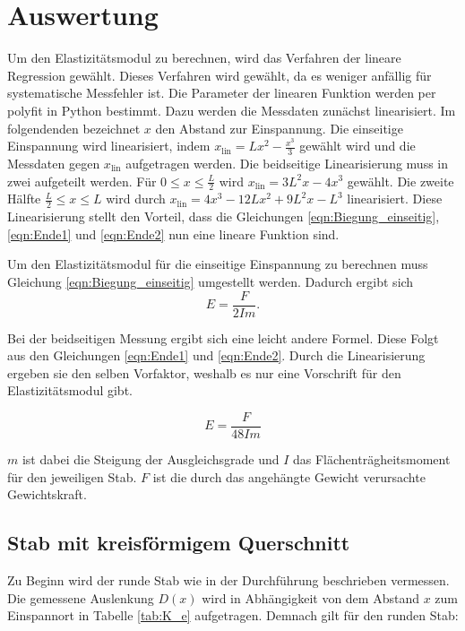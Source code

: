 


\section{Auswertung}
Um den Elastizitätsmodul zu berechnen, wird das Verfahren der lineare Regression gewählt. Dieses Verfahren wird gewählt, 
da es weniger anfällig für systematische Messfehler ist. Die Parameter der linearen Funktion werden per polyfit in Python 
bestimmt. Dazu werden die Messdaten 
zunächst linearisiert. Im folgendenden bezeichnet $x$ den Abstand zur Einspannung.
Die einseitige Einspannung wird linearisiert, indem $x_\text{lin} = L x^2 - \frac{x^3}{3}$ 
gewählt wird und die Messdaten gegen $x_\text{lin}$ aufgetragen werden.
Die beidseitige Linearisierung muss in zwei aufgeteilt werden. Für $0 \leq x \leq \frac{L}{2} $ wird 
$x_\text{lin} = 3L^2 x - 4x^3 $ gewählt. Die zweite Hälfte $\frac{L}{2} \leq x \leq L$ wird durch 
$x_\text{lin} = 4x^3 - 12 L x^2 + 9L^2 x -L^3 $ linearisiert.
Diese Linearisierung stellt den Vorteil, dass die Gleichungen \eqref{eqn:Biegung_einseitig}, \eqref{eqn:Ende1} und 
\eqref{eqn:Ende2} nun eine lineare Funktion sind. 

\noindent Um den Elastizitätsmodul für die einseitige Einspannung zu berechnen muss Gleichung \eqref{eqn:Biegung_einseitig} 
umgestellt werden. Dadurch ergibt sich 
\begin{equation}
    E=\frac{F}{2Im}.
    \label{eqn:E_e}
\end{equation}

\noindent Bei der beidseitigen Messung ergibt sich eine leicht andere Formel. Diese Folgt aus den Gleichungen \eqref{eqn:Ende1} 
und \eqref{eqn:Ende2}. Durch die Linearisierung ergeben sie den selben Vorfaktor, weshalb es nur eine Vorschrift für 
den Elastizitätsmodul gibt.

\begin{equation}
    E = \frac{F}{48 I m}
    \label{eqn:E_b}
\end{equation}

\noindent $m$ ist dabei die Steigung der Ausgleichsgrade und $I$ das Flächenträgheitsmoment für den jeweiligen Stab. 
$F$ ist die durch das angehängte Gewicht verursachte Gewichtskraft.

\label{sec:Auswertung}

\subsection{Stab mit kreisförmigem Querschnitt}
\label{sec:rund}
Zu Beginn wird der runde Stab wie in der Durchführung beschrieben vermessen. Die gemessene Auslenkung $D(x)$ wird in 
Abhängigkeit von dem Abstand $x$ zum Einspannort in Tabelle \ref{tab:K_e} aufgetragen.
Demnach gilt für den runden Stab:

